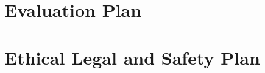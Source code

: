 \documentclass{article}
\begin{document}

\section{Evaluation Plan}


\section{Ethical Legal and Safety Plan}


\printbibliography
\end{document}
